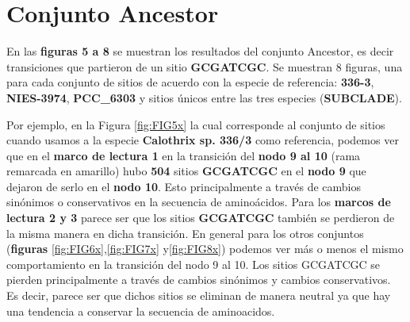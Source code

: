 \documentclass[
]{book}
\begin{document}
\hypertarget{conjunto-ancestor}{%
\section{Conjunto Ancestor}\label{conjunto-ancestor}}

En las \textbf{figuras 5 a 8} se muestran los resultados del conjunto Ancestor, es decir transiciones que partieron de un sitio \textbf{GCGATCGC}. Se muestran 8 figuras, una para cada conjunto de sitios de acuerdo con la especie de referencia: \textbf{336-3}, \textbf{NIES-3974}, \textbf{PCC\_6303} y sitios únicos entre las tres especies (\textbf{SUBCLADE}).

Por ejemplo, en la Figura \ref{fig:FIG5x} la cual corresponde al conjunto de sitios cuando usamos a la especie \textbf{Calothrix sp. 336/3} como referencia, podemos ver que en el \textbf{marco de lectura 1} en la transición del \textbf{nodo 9 al 10} (rama remarcada en amarillo) hubo \textbf{504} sitios \textbf{GCGATCGC} en el \textbf{nodo 9} que dejaron de serlo en el \textbf{nodo 10}. Esto principalmente a través de cambios sinónimos o conservativos en la secuencia de aminoácidos. Para los \textbf{marcos de lectura 2 y 3} parece ser que los sitios \textbf{GCGATCGC} también se perdieron de la misma manera en dicha transición. En general para los otros conjuntos (\textbf{figuras} \ref{fig:FIG6x},\ref{fig:FIG7x} y\ref{fig:FIG8x}) podemos ver más o menos el mismo comportamiento en la transición del nodo 9 al 10. Los sitios GCGATCGC se pierden principalmente a través de cambios sinónimos y cambios conservativos. Es decir, parece ser que dichos sitios se eliminan de manera neutral ya que hay una tendencia a conservar la secuencia de aminoacidos.
\end{document}

